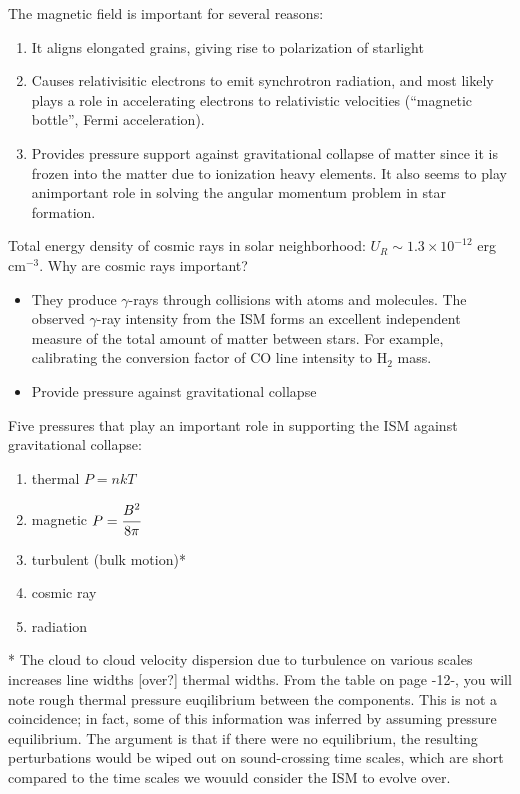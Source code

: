 \documentclass[12pt]{article}
\begin{document}
The magnetic field is important for several reasons:
\begin{enumerate}
    \item It aligns elongated grains, giving rise to polarization
        of starlight
    \item Causes relativisitic electrons to emit synchrotron radiation,
        and most likely plays a role in accelerating electrons to
        relativistic velocities (``magnetic bottle'', Fermi acceleration).
    \item Provides pressure support against gravitational collapse of matter
        since it is frozen into the matter due to ionization heavy elements.
        It also seems to play animportant role in solving the angular momentum
        problem in star formation.
\end{enumerate}

Total energy density of cosmic rays in solar neighborhood:
$U_{R} \sim 1.3\times10^{-12}$ erg cm$^{-3}$.
Why are cosmic rays important?
\begin{itemize}
    \item They produce $\gamma$-rays through collisions with atoms and
        molecules. The observed $\gamma$-ray intensity from the ISM forms
        an excellent independent measure of the total amount of matter
        between stars. For example, calibrating the conversion factor of
        CO line intensity to H$_{2}$ mass.
    \item Provide pressure against gravitational collapse
\end{itemize}
Five pressures that play an important role in supporting the ISM against
gravitational collapse:
\begin{enumerate}
    \item thermal $P=nkT$
    \item magnetic $P=\cfrac{B^{2}}{8\pi}$
    \item turbulent (bulk motion)*
    \item cosmic ray
    \item radiation
\end{enumerate}
* The cloud to cloud velocity dispersion due to turbulence on various
scales increases line widths [over?] thermal widths. From the table
on page -12-, you will note rough thermal pressure euqilibrium between
the components. This is not a coincidence; in fact, some of this
information was inferred by assuming pressure equilibrium. The
argument is that if there were no equilibrium, the resulting
perturbations would be wiped out on sound-crossing time scales, which
are short compared to the time scales we wouuld
consider the ISM to evolve over.
\end{document}

